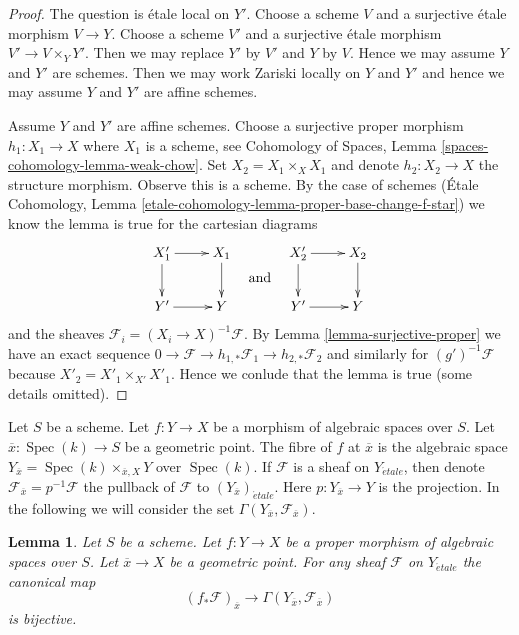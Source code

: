 \documentclass{stacks-project}
\theoremstyle{plain}
\newtheorem{lemma}[subsection]{Lemma}
\theoremstyle{definition}
\theoremstyle{remark}
\numberwithin{equation}{subsection}
\def\Spec{\mathop{\mathrm{Spec}}}
\def\etale{{\acute{e}tale}}
\begin{document}
\begin{proof}
The question is \'etale local on $Y'$. Choose a scheme $V$ and a surjective
\'etale morphism $V \to Y$. Choose a scheme $V'$ and a surjective \'etale
morphism $V' \to V \times_Y Y'$. Then we may replace $Y'$ by $V'$ and
$Y$ by $V$. Hence we may assume $Y$ and $Y'$ are schemes.
Then we may work Zariski locally on $Y$ and $Y'$ and hence we may
assume $Y$ and $Y'$ are affine schemes.

\medskip\noindent
Assume $Y$ and $Y'$ are affine schemes. Choose a surjective proper morphism
$h_1 : X_1 \to X$ where $X_1$ is a scheme, see
Cohomology of Spaces, Lemma \ref{spaces-cohomology-lemma-weak-chow}.
Set $X_2 = X_1 \times_X X_1$ and denote
$h_2 : X_2 \to X$ the structure morphism. Observe this is a scheme.
By the case of schemes
(\'Etale Cohomology, Lemma
\ref{etale-cohomology-lemma-proper-base-change-f-star})
we know the lemma is true for the cartesian diagrams
$$
\vcenter{
\xymatrix{
X'_1 \ar[r] \ar[d] & X_1 \ar[d] \\
Y' \ar[r] & Y
}
}
\quad\text{and}\quad
\vcenter{
\xymatrix{
X'_2 \ar[r] \ar[d] & X_2 \ar[d] \\
Y' \ar[r] & Y
}
}
$$
and the sheaves $\mathcal{F}_i = (X_i \to X)^{-1}\mathcal{F}$.
By Lemma \ref{lemma-surjective-proper} we have an exact sequence
$0 \to \mathcal{F} \to h_{1, *}\mathcal{F}_1 \to h_{2, *}\mathcal{F}_2$
and similarly for $(g')^{-1}\mathcal{F}$ because
$X'_2 = X'_1 \times_{X'} X'_1$. Hence we conlude that the
lemma is true (some details omitted).
\end{proof}

\noindent
Let $S$ be a scheme.
Let $f : Y \to X$ be a morphism of algebraic spaces over $S$. Let
$\overline{x} : \Spec(k) \to S$ be a geometric point. The fibre
of $f$ at $\overline{x}$ is the algebraic space
$Y_{\overline{x}} = \Spec(k) \times_{\overline{x}, X} Y$ over $\Spec(k)$.
If $\mathcal{F}$ is a sheaf on $Y_\etale$, then denote
$\mathcal{F}_{\overline{x}} = p^{-1}\mathcal{F}$
the pullback of $\mathcal{F}$ to $(Y_{\overline{x}})_\etale$.
Here $p : Y_{\overline{x}} \to Y$ is the projection.
In the following we will consider the set
$\Gamma(Y_{\overline{x}}, \mathcal{F}_{\overline{x}})$.

\begin{lemma}
\label{lemma-proper-pushforward-stalk}
Let $S$ be a scheme.
Let $f : Y \to X$ be a proper morphism of algebraic spaces over $S$. Let
$\overline{x} \to X$ be a geometric point.
For any sheaf $\mathcal{F}$ on $Y_\etale$
the canonical map
$$
(f_*\mathcal{F})_{\overline{x}} \longrightarrow
\Gamma(Y_{\overline{x}}, \mathcal{F}_{\overline{x}})
$$
is bijective.
\end{lemma}
\end{document}
